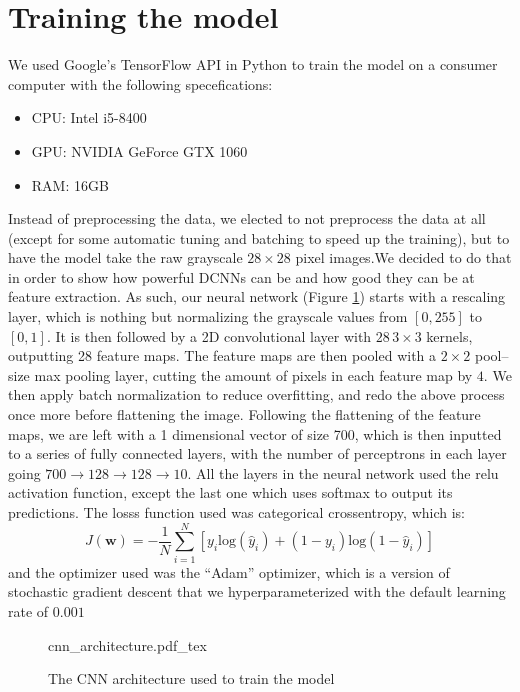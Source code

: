 \documentclass[conference]{IEEEtran}
\begin{document}
\section{Training the model}
We used Google's TensorFlow API\cite{tensorflow2015-whitepaper} in Python to train the model on a consumer computer with the following specefications:
\begin{itemize}
    \item CPU: Intel i5-8400
    \item GPU: NVIDIA GeForce GTX 1060
    \item RAM: 16GB
\end{itemize}
Instead of preprocessing the data, we elected to not preprocess the data at all (except for some automatic tuning and batching to speed up the training), but to have the model take the raw grayscale $28 \times 28$ pixel images.\@ We decided to do that in order to show how powerful DCNNs can be and how good they can be at feature extraction.\@
As such, our neural network (Figure \ref{fig:cnn_architecture}) starts with a rescaling layer, which is nothing but normalizing the grayscale values from $[0, 255]$ to $[0, 1]$. It is then followed by a 2D convolutional layer with $28 \, 3 \times 3$ kernels, outputting 28 feature maps. The feature maps are then pooled with a $2 \times 2$ pool--size max pooling layer, cutting the amount of pixels in each feature map by $4$. We then apply batch normalization\cite{batchnorm} to reduce overfitting, and redo the above process once more before flattening the image.\@
Following the flattening of the feature maps, we are left with a 1 dimensional vector of size 700, which is then inputted to a series of fully connected layers, with the number of perceptrons in each layer going $700 \to 128 \to 128 \to 10$. All the layers in the neural network used the relu activation function, except the last one which uses softmax to output its predictions.
The losss function used was categorical crossentropy, which is:
\begin{equation}
    J(\textbf{w}) = -\frac{1}{N} \sum_{i=1}^{N} \left[ y_i \text{log}(\hat{y}_i) + (1-y_i) \text{log}(1-\hat{y}_i) \right]
\end{equation}
and the optimizer used was the ``Adam'' optimizer, which is a version of stochastic gradient descent\cite{adam} that we hyperparameterized with the default learning rate of $0.001$
\begin{figure}[!htp]
    \centering
    \def\svgwidth{\columnwidth}
    \scriptsize
    {cnn_architecture.pdf_tex}
    \caption{The CNN architecture used to train the model}\label{fig:cnn_architecture}
\end{figure}
\end{document}
